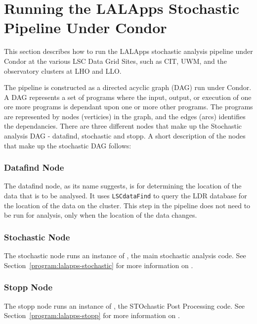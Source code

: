 
\section{Running the LALApps Stochastic Pipeline Under Condor}

This section describes how to run the LALApps stochastic analysis
pipeline under Condor at the various LSC Data Grid Sites, such as CIT,
UWM, and the observatory clusters at LHO and LLO.

The pipeline is constructed as a directed acyclic graph (DAG) run under
Condor. A DAG represents a set of programs where the input, output, or
execution of one ore more programs is dependant upon one or more other
programs. The programs are represented by nodes (verticies) in the
graph, and the edges (arcs) identifies the dependancies. There are three
different nodes that make up the Stochastic analysis DAG - datafind,
stochastic and stopp. A short description of the nodes that make up the
stochastic DAG follows:

\subsubsection{Datafind Node}

The datafind node, as its name suggests, is for determining the location
of the data that is to be analysed. It uses \texttt{LSCdataFind} to
query the LDR database for the location of the data on the cluster. This
step in the pipeline does not need to be run for analysis, only when the
location of the data changes.

\subsubsection{Stochastic Node}

The stochastic node runs an instance of , the
main stochastic analysis code. See
Section~\ref{program:lalapps-stochastic} for more information on
.

\subsubsection{Stopp Node}

The stopp node runs an instance of , the STOchastic
Post Processing code. See Section~\ref{program:lalapps-stopp} for more
information on .

